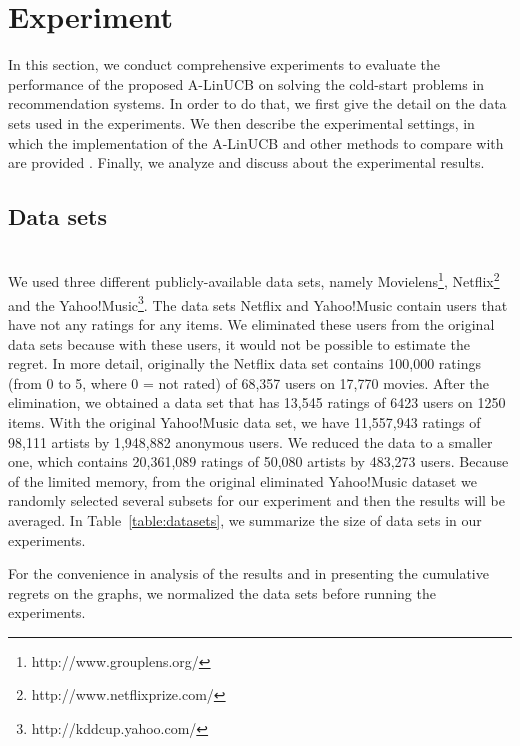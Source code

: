 \documentclass[twoside,leqno,twocolumn]{article}
\newcommand{\hai}[1]{\color{blue}(hai) #1\color{black}}
\begin{document}
\section{Experiment}
In this section, we conduct comprehensive experiments to evaluate the performance of the proposed A-LinUCB on solving the cold-start problems in recommendation systems. In order to do that, we first give the detail on the data sets used in the experiments. We then describe the experimental settings, in which the implementation of the A-LinUCB and other methods to compare with are provided . Finally, we analyze and discuss about the experimental results.

\subsection{Data sets}
~\\
We used three different publicly-available data sets, namely Movielens\footnote{http://www.grouplens.org/}, Netflix\footnote{http://www.netflixprize.com/} and the Yahoo!Music\footnote{http://kddcup.yahoo.com/}. The data sets Netflix and Yahoo!Music contain users that have not any ratings for any items. We eliminated these users from the original data sets because with these users, it would not be possible to estimate the regret. In more detail, originally the Netflix data set contains 100,000 ratings (from 0 to 5, where 0 = not rated) of 68,357 users on 17,770 movies. After the elimination, we obtained a data set that has 13,545 ratings of 6423 users on 1250 items. With the original Yahoo!Music data set, we have 11,557,943 ratings of 98,111 artists by 1,948,882 anonymous users. We reduced the data to a smaller one, which contains 20,361,089 ratings of 50,080 artists by 483,273 users. Because of the limited memory, from the original eliminated Yahoo!Music dataset we randomly selected several subsets for our experiment and then the results will be averaged. In Table~\ref{table:datasets}, we summarize the size of data sets in our experiments. 

For the convenience in analysis of the results and in presenting the cumulative regrets on the graphs, we normalized the data sets before running the experiments. 
\end{document}
